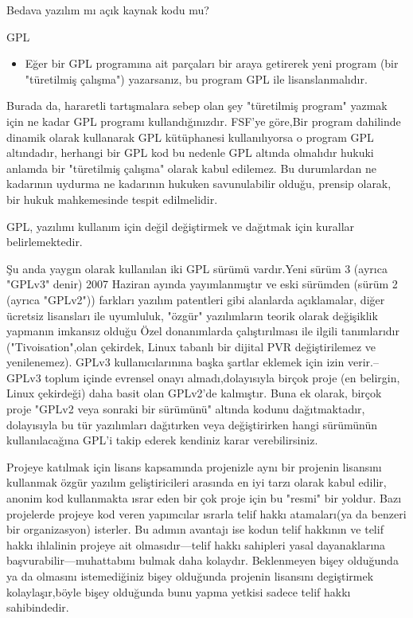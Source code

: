 \begin{section}{Bedava yazılım mı açık kaynak kodu mu?}
\begin{subsection}{GPL}
\begin{itemize}
Eğer biri para ile GPL yazılım satın alırsa, doğal olarak sadece bütün bilgisayarlarında çalıştırma hakkına sahiptir, kopyalayamaz ve yeniden satamaz.(GPL lisansı altında).Bunun bir sonucu olarak da "koltuk başına" GPL yazılım satmak  mantıklı bir iş değildir, bu durumun önemli bir sonucu olarakta fiyatlar açısından rahatlık sağlamasıdır bu sebeple Linux dağıtımları kullanmak mantıklıdır.

 \item Eğer bir GPL programına ait parçaları bir araya getirerek yeni program (bir "türetilmiş çalışma") yazarsanız, bu program GPL ile lisanslanmalıdır.
\end{itemize}

Burada da, hararetli tartışmalara sebep olan şey "türetilmiş program" yazmak için ne kadar GPL programı kullandığınızdır. FSF'ye göre,Bir program dahilinde dinamik olarak kullanarak GPL kütüphanesi kullanılıyorsa o program GPL altındadır, herhangi bir GPL kod  bu nedenle GPL altında olmalıdır hukuki anlamda bir "türetilmiş çalışma" olarak kabul edilemez. Bu durumlardan ne kadarının uydurma ne kadarının hukuken savunulabilir olduğu, prensip olarak, bir hukuk mahkemesinde tespit edilmelidir.

GPL, yazılımı kullanım için değil değiştirmek ve dağıtmak için kurallar belirlemektedir.

Şu anda  yaygın olarak kullanılan  iki GPL sürümü vardır.Yeni sürüm 3 (ayrıca "GPLv3" denir)  2007 Haziran ayında yayımlanmıştır ve eski sürümden (sürüm 2 (ayrıca "GPLv2")) farkları yazılım patentleri gibi alanlarda açıklamalar, diğer ücretsiz lisansları ile uyumluluk, "özgür" yazılımların teorik olarak değişiklik yapmanın imkansız olduğu Özel donanımlarda çalıştırılması ile ilgili tanımlarıdır ("Tivoisation",olan çekirdek, Linux tabanlı bir dijital PVR değiştirilemez ve yenilenemez). GPLv3 kullanıcılarınına başka şartlar eklemek için izin verir.--GPLv3 toplum içinde evrensel onayı almadı,dolayısıyla birçok proje (en belirgin, Linux çekirdeği) daha basit  olan GPLv2'de kalmıştır. Buna ek olarak, birçok proje "GPLv2 veya sonraki bir sürümünü" altında kodunu dağıtmaktadır, dolayısıyla bu tür yazılımları dağıtırken veya değiştirirken hangi sürümünün kullanılacağına GPL'i takip ederek kendiniz karar verebilirsiniz.

Projeye katılmak için  lisans kapsamında projenizle aynı bir projenin lisansını kullanmak özgür yazılım geliştiricileri arasında en iyi tarzı olarak kabul edilir, anonim kod  kullanmakta ısrar eden  bir çok proje için bu  "resmi" bir yoldur. Bazı projelerde projeye kod veren yapımcılar ısrarla telif hakkı atamaları(ya da benzeri bir organizasyon) isterler. Bu adımın avantajı ise kodun telif hakkının ve telif hakkı ihlalinin projeye ait olmasıdır—telif hakkı sahipleri yasal dayanaklarına başvurabilir—muhattabını bulmak daha kolaydır. Beklenmeyen bişey olduğunda ya da olmasını istemediğiniz bişey olduğunda projenin lisansını degiştirmek kolaylaşır,böyle bişey olduğunda bunu yapma yetkisi sadece telif hakkı sahibindedir.


\end{subsection}
\end{section}

